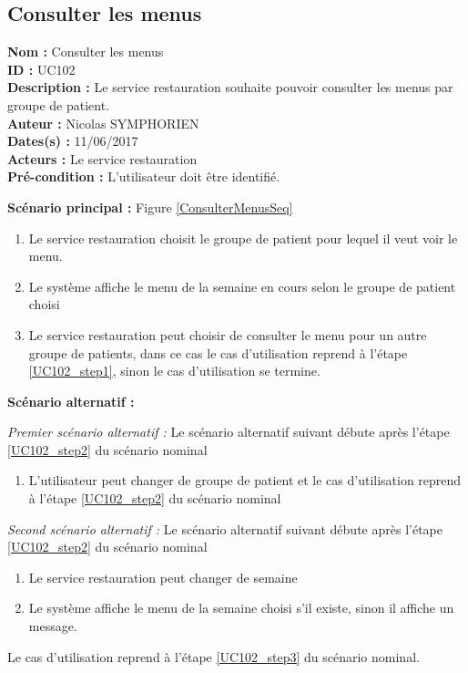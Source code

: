 \subsection{Consulter les menus}

\noindent\textbf{Nom :} Consulter les menus \\
\textbf{ID :} UC102 \\
\textbf{Description :} Le service restauration souhaite pouvoir consulter les menus par groupe de patient. \\
\textbf{Auteur :} Nicolas SYMPHORIEN \\
\textbf{Dates(s) :} 11/06/2017 \\
\textbf{Acteurs :} Le service restauration \\
\textbf{Pré-condition :} L'utilisateur doit être identifié.

\noindent \textbf{Scénario principal :} Figure \ref{ConsulterMenusSeq}

\begin{enumerate}
	\item \label{UC102_step1}Le service restauration choisit le groupe de patient pour lequel il veut voir le menu.
	\item \label{UC102_step2}Le système affiche le menu de la semaine en cours selon le groupe de patient choisi
	\item \label{UC102_step3}Le service restauration peut choisir de consulter le menu pour un autre groupe de patients, dans ce cas le cas d'utilisation reprend à l'étape \ref{UC102_step1}, sinon le cas d'utilisation se termine.
\end{enumerate}

\noindent \textbf{Scénario alternatif :}

\textit{Premier scénario alternatif :}
Le scénario alternatif suivant débute après l'étape \ref{UC102_step2} du scénario nominal
\begin{enumerate}
	\item L'utilisateur peut changer de groupe de patient et le cas d'utilisation reprend à l'étape \ref{UC102_step2} du scénario nominal
\end{enumerate}

\textit{Second scénario alternatif :}
Le scénario alternatif suivant débute après l'étape \ref{UC102_step2} du scénario nominal
\begin{enumerate}
	\item Le service restauration peut changer de semaine
	\item Le système affiche le menu de la semaine choisi s'il existe, sinon il affiche un message. 
\end{enumerate}
Le cas d'utilisation reprend à l'étape \ref{UC102_step3} du scénario nominal.

